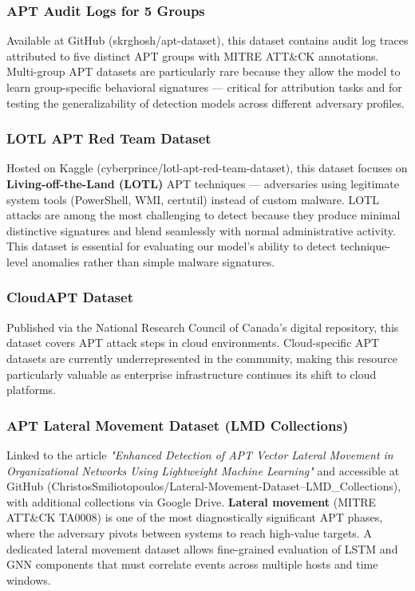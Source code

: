 \subsubsection{APT Audit Logs for 5 Groups}

Available at GitHub (skrghosh/apt-dataset), this dataset contains audit log traces attributed to five distinct APT groups with MITRE ATT\&CK annotations. Multi-group APT datasets are particularly rare because they allow the model to learn group-specific behavioral signatures — critical for attribution tasks and for testing the generalizability of detection models across different adversary profiles.

\subsubsection{LOTL APT Red Team Dataset}

Hosted on Kaggle (cyberprince/lotl-apt-red-team-dataset), this dataset focuses on \textbf{Living-off-the-Land (LOTL)} APT techniques — adversaries using legitimate system tools (PowerShell, WMI, certutil) instead of custom malware. LOTL attacks are among the most challenging to detect because they produce minimal distinctive signatures and blend seamlessly with normal administrative activity. This dataset is essential for evaluating our model's ability to detect technique-level anomalies rather than simple malware signatures.

\subsubsection{CloudAPT Dataset}

Published via the National Research Council of Canada's digital repository, this dataset covers APT attack steps in cloud environments. Cloud-specific APT datasets are currently underrepresented in the community, making this resource particularly valuable as enterprise infrastructure continues its shift to cloud platforms.

\subsubsection{APT Lateral Movement Dataset (LMD Collections)}

Linked to the article \textit{"Enhanced Detection of APT Vector Lateral Movement in Organizational Networks Using Lightweight Machine Learning"} and accessible at GitHub (ChristosSmiliotopoulos/Lateral-Movement-Dataset--LMD\_Collections), with additional collections via Google Drive. \textbf{Lateral movement} (MITRE ATT\&CK TA0008) is one of the most diagnostically significant APT phases, where the adversary pivots between systems to reach high-value targets. A dedicated lateral movement dataset allows fine-grained evaluation of LSTM and GNN components that must correlate events across multiple hosts and time windows.

